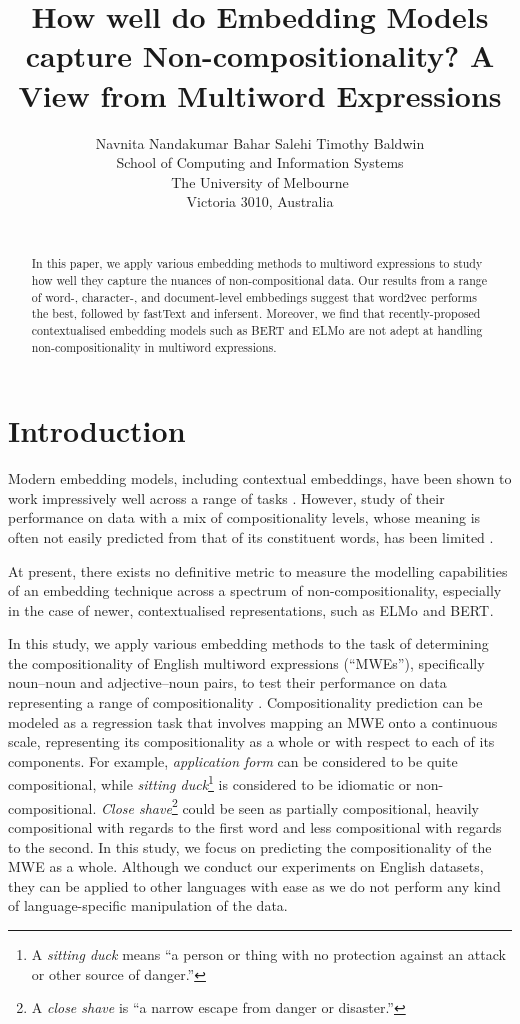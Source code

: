 \documentclass[11pt,a4paper]{article}
\title{How well do Embedding Models capture Non-compositionality? A View
from Multiword Expressions}
\author{Navnita Nandakumar \qquad
  Bahar Salehi \qquad
  Timothy Baldwin \\
  School of Computing and Information Systems \\
The University of Melbourne \\
Victoria 3010, Australia \\
 {\smaller {\tt nnandakumar@student.unimelb.edu.au} \qquad {\tt \{tbaldwin|salehi.b\}@unimelb.edu.au} }  \\
}
\date{}
\newcommand{\lex}[1]{\textit{#1}\xspace}
\newcommand{\embmethod}[2][]{\textsf{#2}$_{\text{#1}}$\xspace}
\newcommand{\wordtovec}{\embmethod{word2vec}}
\newcommand{\infersent}[1][]{\embmethod[#1]{infersent}}
\newcommand{\elmo}{\embmethod{ELMo}}
\newcommand{\fasttext}{\embmethod{fastText}}
\newcommand{\bert}{\embmethod{BERT}}
\begin{document}
\maketitle

\begin{abstract}
  In this paper, we apply various embedding methods to multiword
  expressions to study how well they capture the nuances of
  non-compositional data. Our results from a range of word-, character-,
  and document-level embbedings suggest that \wordtovec performs the
  best, followed by \fasttext and \infersent. Moreover, we find that
  recently-proposed contextualised embedding models such as \bert and
  \elmo are not adept at handling non-compositionality in multiword
  expressions.
\end{abstract}

\section{Introduction}
Modern embedding models, including contextual embeddings, have been shown to work impressively well across a range of tasks \cite{Peters2018,Devlin2018}. However, study of their performance on data with a mix of compositionality levels, whose meaning is often not easily predicted from that of its constituent words, has been limited \cite{Salehi2015,Hakimi2018,Nanda2018}. 

At present, there exists no definitive metric to measure the modelling capabilities of an embedding technique across a spectrum of non-compositionality, especially in the case of newer, contextualised representations, such as \elmo and \bert.

In this study, we apply various embedding methods to the task of determining the compositionality of English multiword expressions (``MWEs''), specifically noun--noun and adjective--noun pairs, to test their performance on data representing a range of compositionality \cite{Sag2002}. Compositionality prediction can be modeled as a regression task \cite{Baldwin2010} that involves mapping an MWE onto a continuous scale, representing its compositionality as a whole or with respect to each of its components. For example, \lex{application form} can be considered to be quite compositional, while \lex{sitting duck}\footnote{A \lex{sitting duck} means ``a person or thing with no protection against an attack or other source of danger.''} is considered to be idiomatic or non-compositional. \lex{Close shave}\footnote{A \lex{close shave} is ``a narrow escape from danger or disaster.''} could be seen as partially compositional, heavily compositional with regards to the first word and less compositional with regards to the second. In this study, we focus on predicting the compositionality of the MWE as a whole. Although we conduct our experiments on English datasets, they can be applied to other languages with ease as we do not perform any kind of language-specific manipulation of the data.
\end{document}

